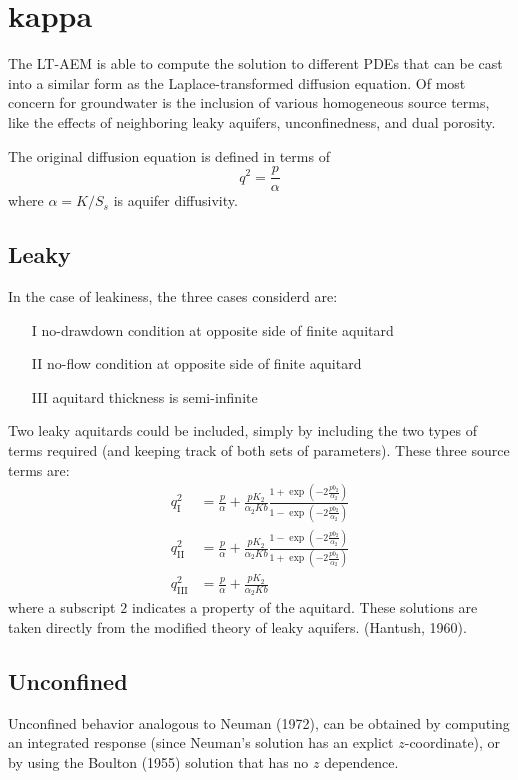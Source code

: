 \documentclass{article}
\begin{document}
\section{kappa}
\label{sec:kappa}

The LT-AEM is able to compute the solution to different PDEs that can
be cast into a similar form as the Laplace-transformed diffusion
equation.  Of most concern for groundwater is the inclusion of various
homogeneous source terms, like the effects of neighboring leaky
aquifers, unconfinedness, and dual porosity.

The original diffusion equation is defined in terms of 
\begin{equation}
  \label{eq:1}
  q^2 = \frac{p}{\alpha}
\end{equation}
where $\alpha=K/S_s$ is aquifer diffusivity.  

\subsection{Leaky}
In the case of leakiness, the three cases considerd are:
\begin{enumerate}
\item[I] no-drawdown condition at opposite side of finite aquitard
\item[II] no-flow condition at opposite side of finite aquitard
\item[III] aquitard thickness is semi-infinite
\end{enumerate}
Two leaky aquitards could be included, simply by including the two
types of terms required (and keeping track of both sets of
parameters).  These three source terms are:
\begin{align}
  q_{\mathrm{I}}^2 &= \frac{p}{\alpha} + \frac{p K_2}{\alpha_2 Kb} \frac{1 + \exp\left(-2 \frac{p b_2}{\alpha_2}\right)}{1 - \exp\left(-2 \frac{p b_2}{\alpha_2}\right)} \\
  q_{\mathrm{II}}^2 &= \frac{p}{\alpha} + \frac{p K_2}{\alpha_2 Kb} \frac{1 - \exp\left(-2 \frac{p b_2}{\alpha_2}\right)}{1 + \exp\left(-2 \frac{p b_2}{\alpha_2}\right)} \\
  q_{\mathrm{III}}^2 &= \frac{p}{\alpha} + \frac{p K_2}{\alpha_2 Kb} 
\end{align}
where a subscript $2$ indicates a property of the aquitard.  These
solutions are taken directly from the modified theory of leaky
aquifers. (Hantush, 1960).

\subsection{Unconfined}
Unconfined behavior analogous to Neuman (1972), can be obtained by
computing an integrated response (since Neuman's solution has an
explict $z$-coordinate), or by using the Boulton (1955) solution that
has no $z$ dependence.
\end{document}
